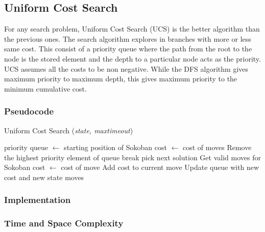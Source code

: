 \subsection{Uniform Cost Search}
\noindent For any search problem, Uniform Cost Search (UCS) is the better algorithm than the previous ones. The search algorithm explores in branches with more or less same cost. This consist of a priority queue where the path from the root to the node is the stored element and the depth to a particular node acts as the priority. UCS assumes all the costs to be non negative. While the DFS algorithm gives maximum priority to maximum depth, this gives maximum priority to the minimum cumulative cost.

\subsubsection{Pseudocode}
\begin{algorithm}[H]
	\caption{Uniform Cost Search (\textit{state, maxtimeout})}
	\label{alg:ucs}
	\begin{algorithmic}[1]
	\State priority queue $\gets$ starting position of Sokoban
	\State cost $\gets$ cost of moves
		\State Remove the highest priority element of queue
			\State break
		\Else
				\State pick next solution
			\Else
				\State Get valid moves for Sokoban
					\State cost $\gets$ cost of move
					\State Add cost to current move
					\State Update queue with new cost and new state
				\EndFor
			\EndIf
		\EndIf
	\EndWhile
	\State \Return moves
	\end{algorithmic}
\end{algorithm}

\subsubsection{Implementation}

\subsubsection{Time and Space Complexity}

